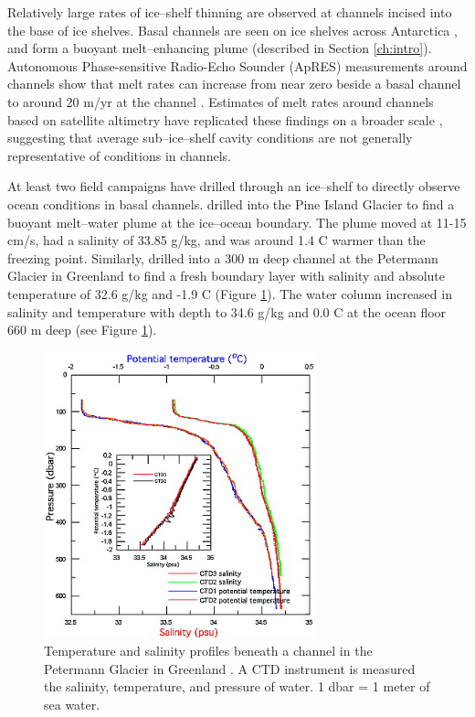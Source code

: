 Relatively large rates of ice--shelf thinning are observed at channels incised into the base of ice shelves. Basal channels are seen on ice shelves across Antarctica \citep{alley2016impacts}, and form a buoyant melt--enhancing plume (described in Section \ref{ch:intro}). Autonomous Phase-sensitive Radio-Echo Sounder (ApRES) measurements around channels show that melt rates can increase from near zero beside a basal channel to around 20 m/yr at the channel \citep{stanton2013channelized, marsh2016high}. Estimates of melt rates around channels based on satellite altimetry have replicated these findings on a broader scale \cite[e.g][]{chartrand2020basal,rignot2008channelized},
suggesting that average sub--ice--shelf cavity conditions are not generally representative of conditions in channels. 

At least two field campaigns have drilled through an ice--shelf to directly observe ocean conditions in basal channels.
\cite{stanton2013channelized} drilled into the Pine Island Glacier to find a buoyant melt--water plume at the ice--ocean boundary. The plume moved at 11-15 cm/s, had a salinity of 33.85 g/kg, and was around 1.4 \textdegree C warmer than the freezing point. Similarly, \cite{rignot2008channelized} drilled into a 300 m deep channel at the Petermann Glacier in Greenland to find a fresh boundary layer with salinity and absolute temperature of  32.6 g/kg and -1.9 \textdegree C (Figure \ref{fig:oceanobs3}). The water column increased in salinity and temperature with depth to 34.6 g/kg and 0.0 \textdegree C at the ocean floor 660 m deep (see Figure \ref{fig:oceanobs3}).

\begin{figure}[!ht]
\centering
\includegraphics[width=0.7\textwidth]{chapters/4/oceanobs3.png}
\caption[]{Temperature and salinity profiles beneath a channel in the Petermann Glacier in Greenland \cite{rignot2008channelized}. A CTD instrument is measured the salinity, temperature, and pressure of water. 1 dbar = 1 meter of sea water.}
\label{fig:oceanobs3}
\end{figure}

